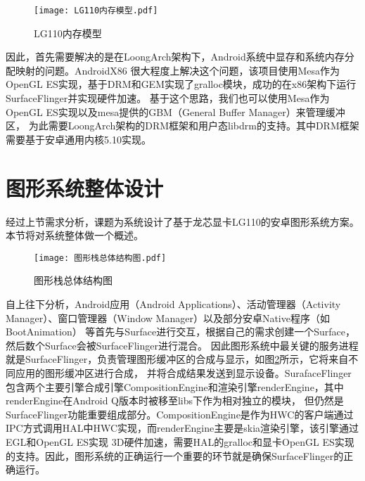 \begin{figure}
  \centering
  \texttt{[image: LG110内存模型.pdf]}
  \caption{LG110内存模型}
  \label{fig:LG110内存模型}
\end{figure}

因此，首先需要解决的是在LoongArch架构下，Android系统中显存和系统内存分配映射的问题。AndroidX86\cite{AndroidX86}
很大程度上解决这个问题，该项目使用Mesa作为OpenGL ES实现，基于DRM和GEM实现了gralloc模块，成功的在x86架构下运行SurfaceFlinger并实现硬件加速\cite{XTYY201710015}。
基于这个思路，我们也可以使用Mesa作为OpenGL ES实现以及mesa提供的GBM（General Buffer Manager）来管理缓冲区，
为此需要LoongArch架构的DRM框架和用户态libdrm的支持。其中DRM框架需要基于安卓通用内核5.10实现。

\section{图形系统整体设计}
经过上节需求分析，课题为系统设计了基于龙芯显卡LG110的安卓图形系统方案。本节将对系统整体做一个概述。

\begin{figure}[h]
  \centering
  \texttt{[image: 图形栈总体结构图.pdf]}
  \caption{图形栈总体结构图}    
  \label{fig:图形栈总体结构图}
\end{figure}

自上往下分析，Android应用（Android Applications）、活动管理器（Activity Manager）、窗口管理器（Window Manager）以及部分安卓Native程序（如BootAnimation）
等首先与Surface进行交互，根据自己的需求创建一个Surface，然后数个Surface会被SurfaceFlinger进行混合\cite{邓凡平2011深入理解}。
因此图形系统中最关键的服务进程就是SurfaceFlinger，负责管理图形缓冲区的合成与显示，如图\ref{fig:图形栈总体结构图}所示，它将来自不同应用的图形缓冲区进行合成，
并将合成结果发送到显示设备。SurafaceFlinger包含两个主要引擎合成引擎CompositionEngine和渲染引擎renderEngine，其中renderEngine在Android Q版本时被移至libs下作为相对独立的模块，
但仍然是SurfaceFlinger功能重要组成部分。CompositionEngine是作为HWC的客户端通过IPC方式调用HAL中HWC实现，而renderEngine主要是skia渲染引擎，该引擎通过EGL和OpenGL ES实现
3D硬件加速，需要HAL的gralloc和显卡OpenGL ES实现的支持。因此，图形系统的正确运行一个重要的环节就是确保SurfaceFlinger的正确运行。

